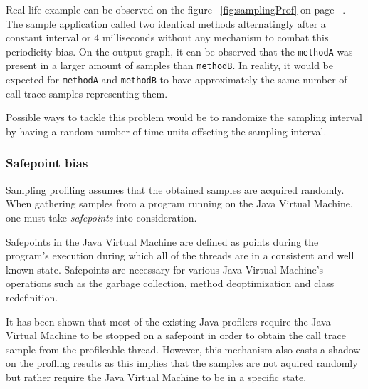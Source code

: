 \documentclass[..thesis.tex]{subfiles}
\begin{document}
Real life example can be observed on the figure ~\ref{fig:samplingProf} on page ~\pageref{fig:samplingProf}. The sample application called two identical methods alternatingly after a constant interval or $4$ milliseconds without any mechanism to combat this periodicity bias. On the output graph, it can be observed that the \texttt{methodA} was present in a larger amount of samples than \texttt{methodB}. In reality, it would be expected for \texttt{methodA} and \texttt{methodB} to have approximately the same number of call trace samples representing them.

Possible ways to tackle this problem would be to randomize the sampling interval by having a random number of time units offseting the sampling interval. 
\subsubsection{Safepoint bias}
Sampling profiling assumes that the obtained samples are acquired randomly. When gathering samples from a program running on the Java Virtual Machine, one must take \textit{safepoints} into consideration.  


Safepoints in the Java Virtual Machine are defined as points during the program's execution during which all of the threads are in a consistent and well known state. Safepoints are necessary for various Java Virtual Machine's operations such as the garbage collection, method deoptimization and class redefinition. \cite{hotspot_glossary}

 
It has been shown that most of the existing Java profilers require the Java Virtual Machine to be stopped on a safepoint in order to obtain the call trace sample from the profileable thread. However, this mechanism also casts a shadow on the profling results as this implies that the samples are not aquired randomly but rather require the Java Virtual Machine to be in a specific state. \cite{mytkowicz_evaluating_2010}
\end{document}

